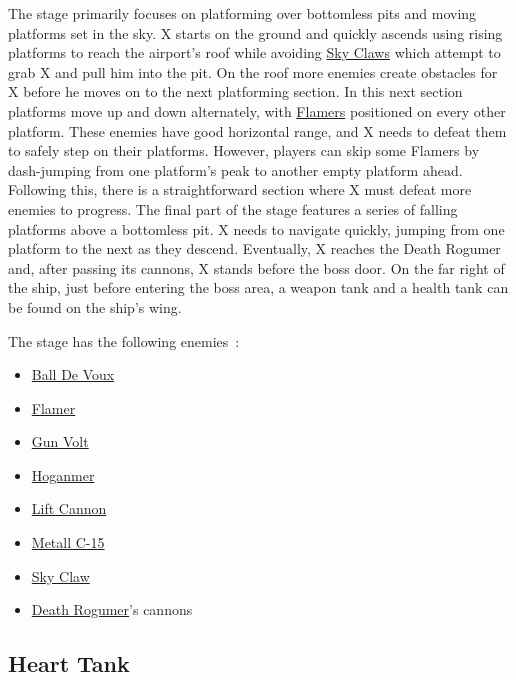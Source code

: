 The stage primarily focuses on platforming over bottomless pits and moving platforms set in the sky. X starts on the ground and quickly ascends using rising platforms to reach the airport's roof while avoiding \hyperlink{enem:Sky_Claw}{Sky Claws} which attempt to grab X and pull him into the pit. On the roof more enemies create obstacles for X before he moves on to the next platforming section. In this next section platforms move up and down alternately, with \hyperlink{enem:Flamer}{Flamers} positioned on every other platform. These enemies have good horizontal range, and X needs to defeat them to safely step on their platforms. However, players can skip some Flamers by dash-jumping from one platform's peak to another empty platform ahead. Following this, there is a straightforward section where X must defeat more enemies to progress. The final part of the stage features a series of falling platforms above a bottomless pit. X needs to navigate quickly, jumping from one platform to the next as they descend. Eventually, X reaches the Death Rogumer and, after passing its cannons, X stands before the boss door. On the far right of the ship, just before entering the boss area, a weapon tank and a health tank can be found on the ship's wing.

The stage has the following enemies~\cite{wiki:Airport}:
\begin{itemize}
	\item \hyperlink{enem:Ball_De_Voux}{Ball De Voux }
	\item \hyperlink{enem:Flamer}{Flamer}
	\item \hyperlink{enem:Gun_Volt}{Gun Volt}
	\item \hyperlink{enem:Hoganmer}{Hoganmer}
	\item \hyperlink{enem:Lift_Cannon}{Lift Cannon}
	\item \hyperlink{enem:Metall_C-15}{Metall C-15}
	\item \hyperlink{enem:Sky_Claw}{Sky Claw}
	\item \hyperlink{vehicle:Death_Rogumer}{Death Rogumer}'s cannons
\end{itemize}

\subsection{Heart Tank}

